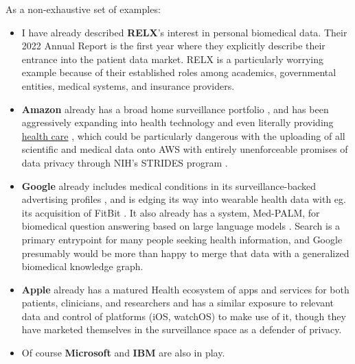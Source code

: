 As a non-exhaustive set of examples:

\begin{itemize}

\item
  I have already described \textbf{RELX}'s interest in personal
  biomedical data. Their 2022 Annual Report \cite{relxAnnualReport20222023}  is the first year where they explicitly
  describe their entrance into the patient data market. RELX is a particularly worrying example because of
  their established roles among academics, governmental entities,
  medical systems, and insurance providers.
\item
  \textbf{Amazon} already has a broad home surveillance portfolio \cite{bridgesAmazonRingLargest2021} , and has been aggressively
  expanding into health technology \cite{AWSAnnouncesAWS2021} 
  and even literally providing \href{https://amazon.care/}{health care}
  \cite{fingasAmazonOfficiallyBecomes2023, lermanAmazonBuiltIts2021} , which could be particularly dangerous with the uploading of all
  scientific and medical data onto AWS with entirely unenforceable
  promises of data privacy through NIH's STRIDES program \cite{quinnYouCanTrust2021} .
\item
  \textbf{Google} already includes medical conditions in its
  surveillance-backed advertising profiles \cite{krashinskyGoogleBrokeCanada2014, bharatGeneratingUserInformation2005} , and is edging its way into wearable health data with eg. its
  acquisition of FitBit \cite{bourreauGoogleFitbitWill2020} . It
  also already has a system, Med-PALM, for biomedical question answering
  based on large language models \cite{piferGooglePlansBoost2023, matiasOurLatestHealth2023, singhalLargeLanguageModels2022} . Search
  is a primary entrypoint for many people seeking health information,
  and Google presumably would be more than happy to merge that data with
  a generalized biomedical knowledge graph.
\item
  \textbf{Apple} already has a matured Health ecosystem of apps and
  services for both patients, clinicians, and researchers \cite{appleEmpoweringPeopleLive2022, appleHealthcare}  and has a similar
  exposure to relevant data and control of platforms (iOS, watchOS) to
  make use of it, though they have marketed themselves in the
  surveillance space as a defender of privacy.
\item
  Of course \textbf{Microsoft} \cite{sinhaOverviewMicrosoftAcademic2015}  and \textbf{IBM} \cite{chenIBMWatsonHow2016}  are also in play.
\end{itemize}

